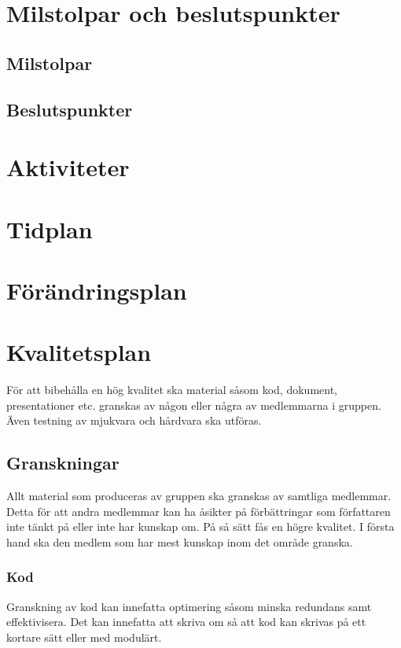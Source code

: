 \documentclass[projektplan/plan.tex]{subfiles}
\begin{document}
\section{Milstolpar och beslutspunkter}
\subsection{Milstolpar}
\subsection{Beslutspunkter}

\section{Aktiviteter}

\section{Tidplan}

\section{Förändringsplan}

\section{Kvalitetsplan}
För att bibehålla en hög kvalitet ska material såsom kod, dokument, presentationer etc. granskas av någon eller några av medlemmarna i gruppen.
Även testning av mjukvara och hårdvara ska utföras.

\subsection{Granskningar}
Allt material som produceras av gruppen ska granskas av samtliga medlemmar. Detta för att andra medlemmar kan ha åsikter på förbättringar som författaren inte tänkt på eller inte har kunskap om. På så sätt fås en högre kvalitet. I första hand ska den medlem som har mest kunskap inom det område granska.

\subsubsection{Kod}	
Granskning av kod kan innefatta optimering såsom minska redundans samt effektivisera. Det kan innefatta att skriva om så att kod kan skrivas på ett kortare sätt eller med modulärt.
\end{document}
